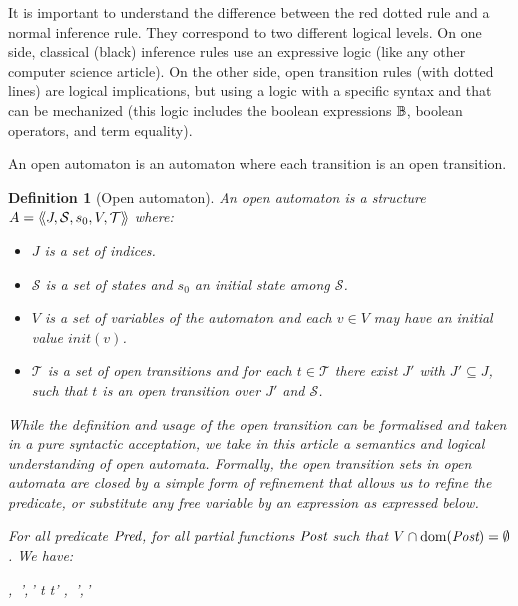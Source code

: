 \documentclass{lmcs}
\makeatletter
\newcommand{\raisemath}[1]{\mathpalette{\raisem@th{#1}}}
\newcommand{\raisem@th}[3]{\raisebox{#1}{$#2#3$}}
\newcommand{\shortotimes}{\!\otimes\!}
\newtheorem{definition}{Definition}
\makeatother
\begin{document}
It is important to understand the difference between the red dotted rule and a normal 
inference rule. They correspond to two different logical levels.
On one side, classical (black) inference rules  use  an expressive logic (like any other computer science article).
 On the other side, open transition rules (with dotted lines) are logical implications, but using a  logic with a specific syntax and that can be mechanized (this logic includes the boolean expressions $\mathbb{B}$, boolean operators, and term equality).


An open automaton is  an automaton where each transition is an open transition.
\begin{definition}[Open automaton]
	\label{def:open-automaton}
	An \emph{open automaton} is a structure\\ $A =
	\langle\hspace{-0.45ex}\langle J,\mathcal{S},s_0,V,\mathcal{T}\rangle\hspace{-0.45ex}\rangle$ where:
	\begin{itemize}
		\item[$\bullet$]   $J$ is a  set of indices.
		\item[$\bullet$]   $\mathcal{S}$ is a set of states and $s_0$ an initial state
		  among $\mathcal{S}$.
 \item[$\bullet$] $V$ is a set of variables of the automaton
		and each $v\in V$ may have an initial value $init(v)$.
		\item[$\bullet$] $\mathcal{T}$ is a set of open transitions and for each
		$t\in \mathcal{T}$ there exist  $J'$ with  $J'
		\subseteq J$, such that $t$ is an open transition over  $J'$
		and  $\mathcal{S}$.
		
	\end{itemize}

While the definition and usage of the open transition can be formalised and taken in a pure syntactic acceptation, we take in this article a semantics and logical understanding of open automata. 
Formally, the open transition sets in open automata are closed by a simple form of refinement that
allows us to refine the predicate, or substitute any free variable by
an expression as expressed below.

For all predicate $\Pred$, for all partial functions $\Post$ such that $V\cap \dom(\Post)=\emptyset$. We have: 
		 \begin{mathpar}
    \openrule
         {
           \set{\beta}, \Pred\,',\Post\,'}
          {t \OTarrow {\alpha} t'}\in{}
\implies
    \openrule
         {
           \set{\beta}\subst{\Post}, \Pred\,'\subst{\Post}\land\Pred,\Post\shortotimes\Post\,'}
         {\raisemath{-2pt}{t \OTarrow {\alpha\subst{\Post}} {t'}}{}}
 \in{}
\end{mathpar}
\end{definition}
\end{document}
